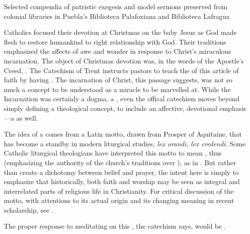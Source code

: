 {Selected compendia of patristic exegesis and model sermons preserved from
colonial libraries in Puebla's Biblioteca Palafoxiana and Biblioteca Lafragua}

Catholics focused their devotion at Christmas on the baby Jesus as God
made flesh to restore humankind to right relationship with God. 
Their traditions emphasized the affects of awe and wonder in response to
Christ's miraculous incarnation.
The object of Christmas devotion was, in the words of the Apostle's Creed,
.%
    \Autocites[34, 46]{Catholic:Catechismus1614}
The Catechism of Trent instructs pastors to teach the 
of this article of faith by having .%
    \Autocite[50]{Catholic:Catechismus1614}
The incarnation of Christ, this passage suggests, was not so much a concept to
be understood as a miracle to be marvelled at.
While the Incarnation was certainly a dogma, a , even the
offical catechism moves beyond simply defining a theological concept, to include
an affective, devotional emphasis---a  as
well.%
\begin{Footnote}
    The idea of a  comes from a Latin motto, drawn from
    Prosper of Aquitaine, that has become a standby in modern liturgical
    studies, \emph{lex orandi, lex credendi}.
    Some Catholic liturgical theologians have interpreted this motto to mean
    , thus (emphasizing
    the authority of the church's traditions over ), as
    in \autocite{Kavanagh:LiturgicalTheology}.
    But rather than create a dichotomy between belief and prayer, the intent
    here is simply to emphasize that historically, both faith and worship may be
    seen as integral and interrelated parts of religious life in Christianity.
    For critical discussion of the motto, with attentions to its actual origin
    and its changing meaning in recent scholarship, see
    \autocite{Irwin:LexOrandi}.
\end{Footnote}
The proper response to meditating on this , the
catechism says, would be .%
    \Autocite[50]{Catholic:Catechismus1614}

